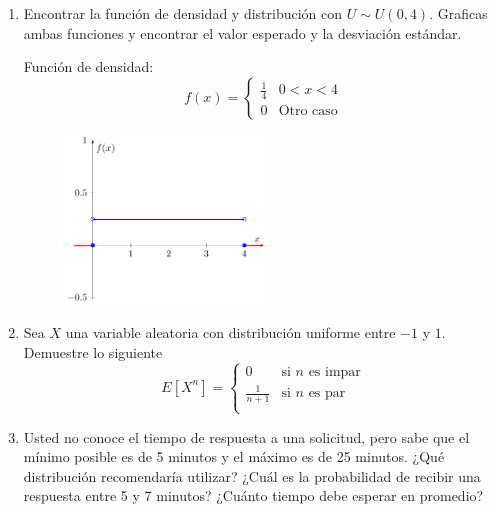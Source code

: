 \documentclass[a4paper, 12pt]{article}
\newcommand{\Pspace}{0.5cm}
\newcommand{\Aspace}{0.2cm}
\begin{document}
\begin{enumerate}
        \vspace{\Pspace}
        \item Encontrar la función de densidad y distribución con $U \sim U(0, 4)$. Graficas ambas funciones y encontrar el valor esperado y la desviación estándar.
            \vspace{\Aspace} \par
            { \color{azul} 
                Función de densidad:
                \[
                    f(x) = 
                    \begin{cases}
                        \frac{1}{4} &   0 < x < 4 \\
                        0           &   \text{Otro caso}
                    \end{cases}
                \]
                \begin{figure}[H]
                    \centering
                    \includegraphics[width=0.5\textwidth]{Assets/Pdf/T10P2IA.pdf}
                \end{figure}
            }

        \item Sea $X$ una variable aleatoria con distribución uniforme entre $-1$ y $1$. Demuestre lo siguiente
        \[
            E[X^{n}] =
            \begin{cases}
                0 & \text{si $n$ es impar}  \\
                \frac{1}{n + 1} & \text{si $n$ es par} \\
            \end{cases}
        \]
            \vspace{\Aspace} \par
            { \color{azul} }

        \item Usted no conoce el tiempo de respuesta a una solicitud, pero sabe que el mínimo posible es de 5 minutos y el máximo es de 25 minutos. ¿Qué distribución recomendaría utilizar? ¿Cuál es la probabilidad de recibir una respuesta entre 5 y 7 minutos? ¿Cuánto tiempo debe esperar en promedio?
    \end{enumerate}
\end{document}
